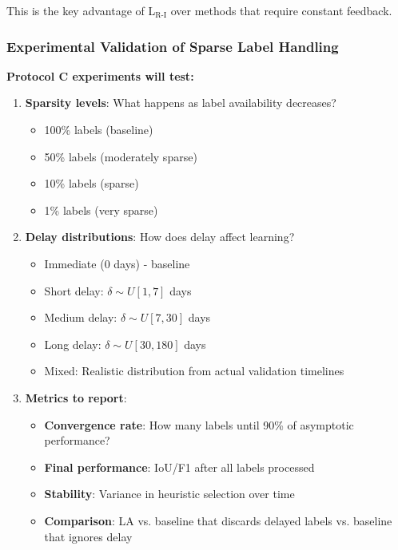 \documentclass[11pt]{article}
\begin{document}
This is the key advantage of L$_{\text{R-I}}$ over methods that require constant feedback.

\subsubsection{Experimental Validation of Sparse Label Handling}

\textbf{Protocol C experiments will test:}

\begin{enumerate}
    \item \textbf{Sparsity levels}: What happens as label availability decreases?
    \begin{itemize}
        \item 100\% labels (baseline)
        \item 50\% labels (moderately sparse)
        \item 10\% labels (sparse)
        \item 1\% labels (very sparse)
    \end{itemize}

    \item \textbf{Delay distributions}: How does delay affect learning?
    \begin{itemize}
        \item Immediate (0 days) - baseline
        \item Short delay: $\delta \sim U[1, 7]$ days
        \item Medium delay: $\delta \sim U[7, 30]$ days
        \item Long delay: $\delta \sim U[30, 180]$ days
        \item Mixed: Realistic distribution from actual validation timelines
    \end{itemize}

    \item \textbf{Metrics to report}:
    \begin{itemize}
        \item \textbf{Convergence rate}: How many labels until 90\% of asymptotic performance?
        \item \textbf{Final performance}: IoU/F1 after all labels processed
        \item \textbf{Stability}: Variance in heuristic selection over time
        \item \textbf{Comparison}: LA vs. baseline that discards delayed labels vs. baseline that ignores delay
    \end{itemize}
\end{enumerate}
\end{document}
